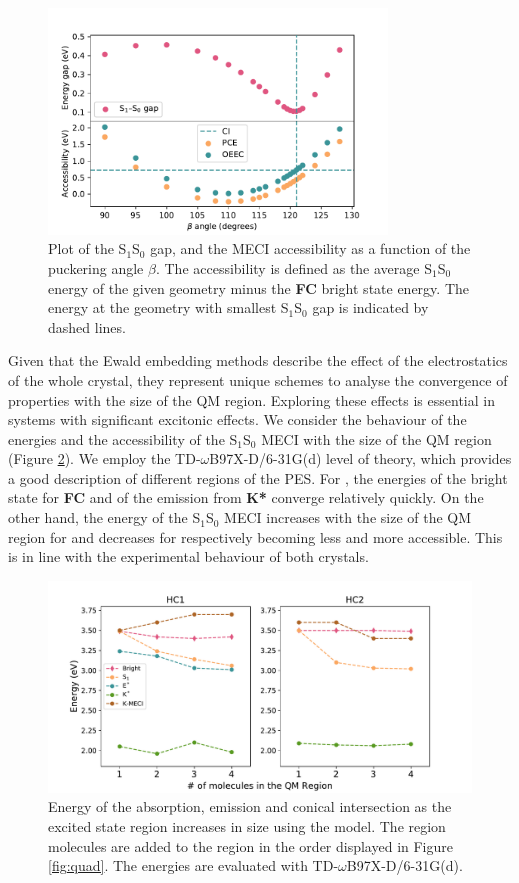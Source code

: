  
\begin{figure}
\centering
\includegraphics[width=9cm]{Chapters/5Ewald/energy_scan.pdf}
\caption{Plot of the S$_1$\textendash{}S$_0$ gap, and the MECI accessibility as a function of the puckering angle $\beta$. The accessibility is defined as the average S$_1$\textendash{}S$_0$ energy of the given geometry minus the \textbf{FC} bright state energy. The \EEC{} energy at the geometry with smallest S$_1$\textendash{}S$_0$ gap is indicated by dashed lines.}
\label{fig:scan}
\end{figure}

Given that the Ewald embedding methods describe the effect of the electrostatics of the whole crystal, they represent unique schemes to analyse the convergence of properties with the size of the QM region. Exploring these effects is essential in systems with significant excitonic effects. We consider the behaviour of the energies and the accessibility of the S$_1$\textendash{}S$_0$ MECI with the size of the QM region (Figure \ref{fig:cluster}). We employ the TD-$\omega$B97X-D\//6-31G(d) level of theory, which provides a good description of different regions of the PES. For \HC{}, the energies of the bright state for \textbf{FC} and of the emission from \textbf{K*} converge relatively quickly. On the other hand, the energy of the S$_1$\textendash{}S$_0$ MECI increases with the size of the QM region for \HC{} and decreases for \HCC{} respectively becoming less and more accessible. This is in line with the experimental behaviour of both crystals.



\begin{figure}
\centering
\includegraphics[width=12cm]{Chapters/5Ewald/aggregates.pdf}
\caption{Energy of the absorption, emission and conical intersection as the excited state region increases in size using the \EEC{} model. The region molecules are added to the region in the order displayed in Figure \ref{fig:quad}. The energies are evaluated with TD-$\omega$B97X-D\slash{}6-31G(d).}
\label{fig:cluster}
\end{figure}


